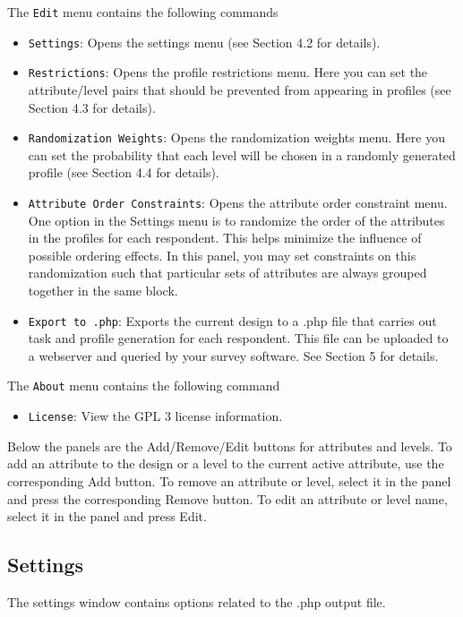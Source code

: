 \documentclass[12pt]{article}
\begin{document}
The \texttt{Edit} menu contains the following commands
\begin{itemize}
\item \texttt{Settings}: Opens the settings menu (see Section 4.2 for details).
\item \texttt{Restrictions}: Opens the profile restrictions menu. Here you can set the attribute/level pairs that should be prevented from appearing in profiles (see Section 4.3 for details).
\item \texttt{Randomization Weights}: Opens the randomization weights menu. Here you can set the probability that each level will be chosen in a randomly generated profile (see Section 4.4 for details).
\item \texttt{Attribute Order Constraints}: Opens the attribute order constraint menu. One option in the Settings menu is to randomize the order of the attributes in the profiles for each respondent. This helps minimize the influence of possible ordering effects. In this panel, you may set constraints on this randomization such that particular sets of attributes are always grouped together in the same block.
\item \texttt{Export to .php}: Exports the current design to a .php file that carries out task and profile generation for each respondent. This file can be uploaded to a webserver and queried by your survey software. See Section 5 for details.
\end{itemize}

The \texttt{About} menu contains the following command
\begin{itemize}
\item \texttt{License}: View the GPL 3 license information.
\end{itemize}

Below the panels are the Add/Remove/Edit buttons for attributes and levels. To add an attribute to the design or a level to the current active attribute, use the corresponding Add button. To remove an attribute or level, select it in the panel and press the corresponding Remove button. To edit an attribute or level name, select it in the panel and press Edit.



\subsection{Settings}

The settings window contains options related to the .php output file.
\end{document}
